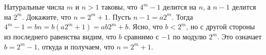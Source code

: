 \problem{}
Натуральные числа $m$ и $n > 1$ таковы, что $4^m-1$ делится на $n$, а $n-1$
делится на $2^m$.
Докажите, что $n = 2^m+1$.
\solution
Пусть $n - 1 = a 2^m$.
Тогда $4^m - 1 = b n = b (a 2^m + 1) = a b 2^m + b$.
Ясно, что $b < 2^m$, но с другой стороны из последнего равенства видим, что $b$
сравнимо с $-1$ по модулю $2^m$.
Это означает $b = 2^m - 1$, откуда и получаем, что $n = 2^m + 1$.
\endproblem
